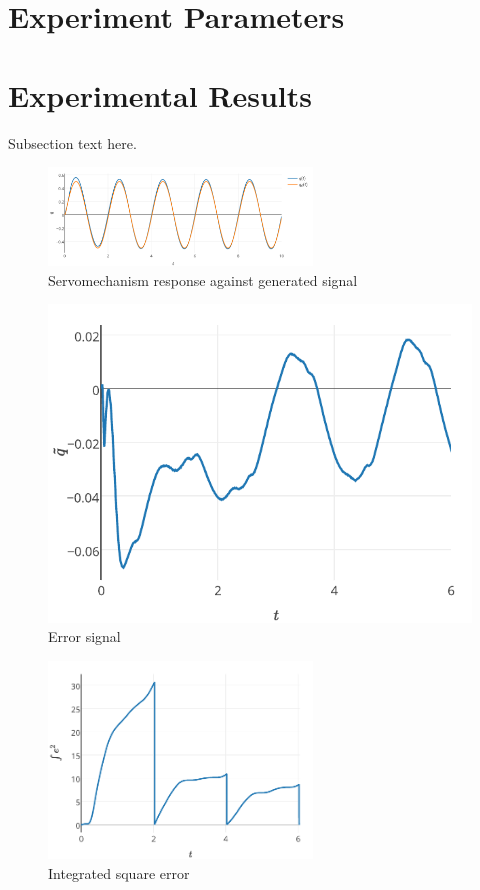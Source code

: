 \documentclass[journal]{IEEEtran}
\begin{document}
\section{Experiment Parameters}
    

\section{Experimental Results}
Subsection text here.

\begin{figure}[!t]
    \centering
    \includegraphics[width=7cm]{respuestatrayectoria}
    \caption{Servomechanism response against generated signal}
    \label{fig_respuesta}
\end{figure}

\begin{figure}[!t]
    \centering
    \includegraphics[width=\textwidth]{error}
    \caption{Error signal}
    \label{fig_error}
\end{figure}

\begin{figure}[!t]
    \centering
    \includegraphics[width=7cm]{IEC}
    \caption{Integrated square error}
    \label{fig_iec}
\end{figure}
\end{document}
